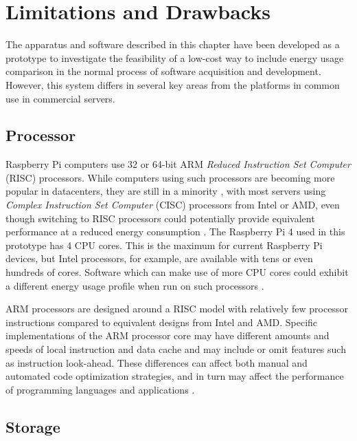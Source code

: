 \section{Limitations and Drawbacks}
\label{limitations}

The apparatus and software described in this chapter have been developed as a prototype to investigate the feasibility of a low-cost way to include energy usage comparison in the normal process of software acquisition and development. However, this system differs in several key areas from the platforms in common use in commercial servers.

\subsection{Processor}

Raspberry Pi computers use 32 or 64-bit ARM \emph{Reduced Instruction Set Computer} (RISC) processors. While computers using such processors are becoming more popular in datacenters, they are still in a minority  \citep{Korolov2022}, with most servers using \emph{Complex Instruction Set Computer} (CISC) processors from Intel or AMD, even though switching to RISC processors could potentially provide equivalent performance at a reduced energy consumption \citep{Varghese2015}. The Raspberry Pi 4 used in this prototype has 4 CPU cores. This is the maximum for current Raspberry Pi devices, but Intel processors, for example, are available with tens \citep{Intel2022} or even hundreds \citep{Intel2023} of cores. Software which can make use of more CPU cores could exhibit a different energy usage profile when run on such processors \citep{Basmadjian2012}.

ARM processors are designed around a RISC model with relatively few processor instructions compared to equivalent designs from Intel and AMD. Specific implementations of the ARM processor core may have different amounts and speeds of local instruction and data cache and may include or omit features such as instruction look-ahead. These differences can affect both manual and automated code optimization strategies, and in turn may affect the performance of programming languages and applications \citep{Hartley2022}.

\subsection{Storage}


